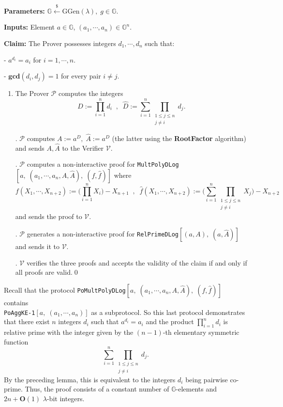 \documentclass[11pt, lettersize, notitlepage, leqno, footskip=0.6cm]{article}
\newcommand{\pl}{\prod\limits}
\newcommand{\slim}{\sum\limits}
\newcommand{\mc}{\mathcal}
\newcommand{\mb}{\mathbb}
\newcommand{\mbf}{\mathbf}
\newcommand{\mr}{\mathrm}
\newcommand{\lam}{\lambda}
\newcommand{\lamb}{\lambda}
\newcommand{\what}{\widehat}
\newcommand{\bO}{\mbf{O}}
\newcommand{\mP}{\mc{P}}
\newcommand{\V}{\mc{V}}
\newcommand{\vs}{\vspace{-0.15cm}}
\newcommand{\noin}{\noindent}
\newcommand{\GCD}{\mbf{gcd}}
\numberwithin{equation}{section}
\begin{document}
\noindent \textbf{Parameters:} $\mb{G}\xleftarrow{\$} \mr{GGen}(\lamb), \; g\in \mb{G}$.

\noindent \textbf{Inputs:} Element $a\in\mb{G}$, $(a_1,\cdots,a_n)\in \mb{G}^n$.

\noindent \textbf{Claim:} The Prover possesses integers $d_1,\cdots, d_n$ such that:

\noindent - $a^{d_i} = a_i$ for $i = 1,\cdots, n$.

\noindent - $\GCD(d_i, d_j) = 1$ for every pair $i\neq j$.


\begin{enumerate}[wide, labelwidth=!, labelindent=0pt]\vs \item The Prover $\mP$ computes the integers \vs $$D:=\pl_{i=1}^n d_i\;\;,\;\; \what{D}:= \slim_{i=1}^n \pl_{\substack{1\leq j\leq n \\ j\neq i}} d_j.$$ \vs

\noin 2. $\mP$ computes $A:= a^D,\;\what{A}:= a^{\what{D}} $ (the latter using the \textbf{RootFactor} algorithm) and sends $A,\what{A}$ to the Verifier $\V$.

\begin{comment}
\noin 3. $\mP$ computes a non-interactive proof for \verb|AggKE-1|$[a,\;(a_1,\cdots,a_n)]$ and sends it to $\V$.

\noin 4. \end{comment}


\noin 3. $\mP$ computes a non-interactive proof for \verb|MultPolyDLog|$[a,\;(a_1,\cdots,a_n,A, \what{A}),\; (f,\what{f})]$ where \vs $$f(X_1,\cdots,X_{n+2}):= \big(\pl_{i=1}^n X_i\big) -X_{n+1}\;\;,\;\;\what{f}(X_1,\cdots, X_{n+2}):= \big(\slim_{i=1}^n \pl_{\substack{1\leq j\leq n \\ j\neq i}} X_j\big) - X_{n+2}$$ and sends the proof to $\V$.

\noin 4. $\mP$ generates a non-interactive proof for \verb|RelPrimeDLog|$[(a,A),\;(a,\what{A})]$ and sends it to $\V$.

\noin 5. $\V$ verifies the three proofs and accepts the validity of the claim if and only if all proofs are valid.\qed \end{enumerate}

Recall that the protocol \verb|PoMultPolyDLog|$[a,\;(a_1,\cdots,a_n,A, \what{A}),\; (f,\what{f})]$  contains\\ \verb|PoAggKE-1|$[a,\;(a_1,\cdots,a_n)]$ as a subprotocol. So this last protocol demonstrates that there exist $n$ integers $d_i$ such that $a^{d_i} = a_i$ and the product $\pl_{i=1}^n d_i$ is relative prime with the integer given by the $(n-1)$-th elementary symmetric function \vs $$\slim_{i=1}^n \pl_{\substack{1\leq j\leq n \\ j\neq i}} d_j. $$ By the preceding lemma, this is equivalent to the integers $d_i$ being pairwise co-prime. Thus, the proof consists of a constant number of $\mb{G}$-elements and $2n+\bO(1)$ $\lam$-bit integers. 
\end{document}
